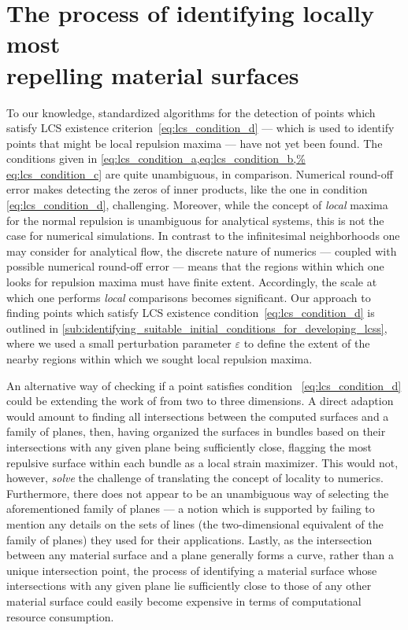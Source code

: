 \section[The process of identifying locally most repelling material
surfaces]{The process of identifying locally most \\\phantom{5.3} repelling
    material surfaces}
\label{sec:the_process_of_identifying_locally_most_normally_repelling_%
material_surfaces}

To our knowledge, standardized algorithms for the detection of points which
satisfy LCS existence criterion~\eqref{eq:lcs_condition_d} --- which is used to
identify points that might be local repulsion maxima --- have not yet been
found. The conditions given in \cref{eq:lcs_condition_a,eq:lcs_condition_b,%
eq:lcs_condition_c} are quite unambiguous, in comparison. Numerical round-off
error makes detecting the zeros of inner products, like the one in condition~%
\eqref{eq:lcs_condition_d}, challenging. Moreover, while the concept of
\emph{local} maxima for the normal repulsion is unambiguous for analytical
systems, this is not the case for numerical simulations. In contrast to the
infinitesimal neighborhoods one may consider for analytical flow, the discrete
nature of numerics --- coupled with possible numerical round-off error ---
means that the regions within which one looks for repulsion maxima must have
finite extent. Accordingly, the scale at which one performs \emph{local}
comparisons becomes significant. Our approach to finding points which satisfy
LCS existence condition~\eqref{eq:lcs_condition_d} is outlined in
\cref{sub:identifying_suitable_initial_conditions_for_developing_lcss}, where
we used a small perturbation parameter $\varepsilon$ to define the extent of the
nearby regions within which we sought local repulsion maxima.

An alternative way of checking if a point satisfies condition~%
\eqref{eq:lcs_condition_d} could be extending the work of
\textcite{farazmand2012computing} from two to three dimensions. A direct
adaption would amount to finding all intersections between the computed
surfaces and a family of planes, then, having organized the surfaces in bundles
based on their intersections with any given plane being sufficiently close,
flagging the most repulsive surface within each bundle as a local strain
maximizer. This would not, however, \emph{solve} the challenge of translating
the concept of locality to numerics. Furthermore, there does not appear to be
an unambiguous way of selecting the aforementioned family of planes --- a
notion which is supported by \citeauthor{farazmand2012computing} failing to
mention any details on the sets of lines (the two-dimensional equivalent of
the family of planes) they used for their applications. Lastly, as the
intersection between any material surface and a plane generally forms a
curve, rather than a unique intersection point, the process of identifying a
material surface whose intersections with any given plane lie sufficiently
close to those of any other material surface could easily become expensive in
terms of computational resource consumption.

